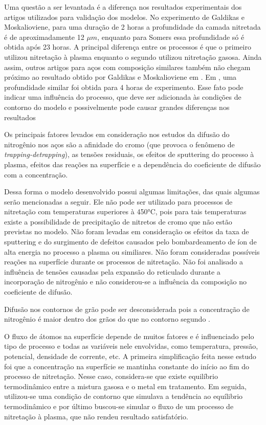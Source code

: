 Uma questão a ser levantada é a diferença nos resultados experimentais dos artigos utilizados para validação dos modelos. No experimento de Galdikas e Moskalioviene, para uma duração de 2 horas a profundidade da camada nitretada é de aproximadamente   12 $\mu m$, enquanto para Somers essa profundidade só é obtida após 23 horas. A principal diferença entre os processos é que o primeiro utilizou nitretação à plasma enquanto o segundo utilizou nitretação gasosa.  Ainda assim, outros artigos para aços com composição similares também não chegam próximo ao resultado obtido por Galdikas e Moskalioviene em \cite{moskalioviene2011modeling}. Em \cite{galdikas2011modeling}, uma profundidade similar foi obtida para 4 horas de experimento. Esse fato pode indicar uma influência do processo, que deve ser adicionada às condições de contorno do modelo e possivelmente pode causar grandes diferenças nos resultados

Os principais fatores levados em consideração nos estudos da difusão do nitrogênio nos aços são a afinidade do cromo (que provoca o fenômeno de \textit{trapping-detrapping}), as tensões residuais, os efeitos de sputtering do processo à plasma, efeitos das reações na superfície e a dependência do coeficiente de difusão com a concentração.

Dessa forma o modelo desenvolvido possui algumas limitações, das quais algumas serão mencionadas a seguir. Ele não pode ser utilizado para processos de nitretação com temperaturas superiores à 450°C, pois para tais temperaturas existe a possibilidade de precipitação de nitretos de cromo que não estão previstas no modelo. Não foram levadas em consideração os efeitos da taxa de sputtering e do surgimento de defeitos causados pelo bombardeamento de íon de alta energia no processo a plasma ou similiares. Não foram consideradas possíveis reações na superfície durante os processos de nitretação. Não foi analisado a influência de tensões causadas pela expansão do reticulado durante a incorporação de nitrogênio e não considerou-se a influência da composição no coeficiente de difusão.

Difusão nos contornos de grão pode ser desconsiderada pois a concentração de nitrogênio é maior dentro dos grãos do que no contorno segundo \cite{parascandola2000nitrogen}.

O fluxo de átomos na superfície depende de muitos fatores e é influenciado pelo tipo de processo e todas as variáveis nele envolvidas, como temperatura, pressão, potencial, densidade de corrente, etc.
A primeira simplificação feita nesse estudo foi que a concentração na superfície se mantinha constante do início ao fim do processo de nitretação. Nesse caso, considera-se que existe equilíbrio termodinâmico entre a  mistura gasosa e o metal em tratamento. Em seguida, utilizou-se uma condição de contorno que simulava a  tendência ao equílibrio termodinâmico e por último buscou-se simular o fluxo de um processo de nitretação à plasma, que não rendeu resultado satisfatório.
 
